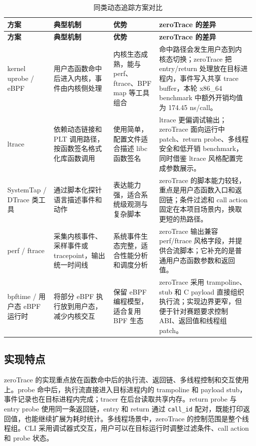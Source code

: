 \documentclass[UTF8,a4paper,11pt,fontset=fandol]{ctexart}
\newcommand{\code}[1]{\texttt{#1}}
\begin{document}
\begin{longtable}{@{}P{2.45cm}P{2.9cm}P{3.75cm}P{4.55cm}@{}}
\caption{同类动态追踪方案对比}\label{tab:related-work}\\
\toprule
\textbf{方案} & \textbf{典型机制} & \textbf{优势} & \textbf{zeroTrace 的差异}\\
\midrule
\endfirsthead
\toprule
\textbf{方案} & \textbf{典型机制} & \textbf{优势} & \textbf{zeroTrace 的差异}\\
\midrule
\endhead
kernel uprobe / eBPF & 用户态函数命中后进入内核，事件由内核侧处理 & 内核生态成熟，能与 perf、ftrace、BPF map 等工具组合 & 命中路径会发生用户态到内核态切换；zeroTrace 把 entry/return 处理放在目标进程内，事件写入共享 trace buffer，本轮 x86\_64 benchmark 中额外开销均值为 174.45 ns/call。\\
ltrace & 依赖动态链接和 PLT 调用路径，按函数签名格式化库函数调用 & 使用简单，配置文件适合描述 libc 函数签名 & ltrace 更偏调试输出；zeroTrace 面向运行中 patch、return probe、多线程安全和低开销 benchmark，同时借鉴 ltrace 风格配置完成参数展示。\\
SystemTap / DTrace 类工具 & 通过脚本化探针语言描述事件和动作 & 表达能力强，适合系统级观测与复杂脚本 & zeroTrace 的脚本能力较轻，重点是用户态函数入口和返回链；条件过滤和 call action 固定在本项目场景内，换取更短的热路径。\\
perf / ftrace & 采集内核事件、采样事件或 tracepoint，输出统一时间线 & 系统事件生态完整，适合性能分析和调度分析 & zeroTrace 输出兼容 perf/ftrace 风格字段，并提供合流脚本；它补充的是普通用户态函数参数和返回值。\\
bpftime / 用户态 eBPF 运行时 & 将部分 eBPF 执行放到用户态，减少内核交互 & 保留 eBPF 编程模型，适合复用 BPF 生态 & zeroTrace 采用 trampoline、stub 和 C payload 直接组织执行流；实现边界更窄，但便于针对赛题要求控制 ABI、返回值和线程组 patch。\\
\bottomrule
\end{longtable}

\subsection{实现特点}

zeroTrace 的实现重点放在函数命中后的执行流、返回链、多线程控制和交互使用上。probe 命中后，执行流直接进入目标进程内的 trampoline 和 payload stub，事件记录也在目标进程内完成；tracer 在后台读取共享内存。return probe 与 entry probe 使用同一条返回链，entry 和 return 通过 \code{call\_id} 配对，既能打印返回值，也能继续扩展为耗时统计。多线程场景中，zeroTrace 的控制范围是整个线程组。CLI 采用调试器式交互，用户可以在目标运行时调整过滤条件、call action 和 probe 状态。
\end{document}
